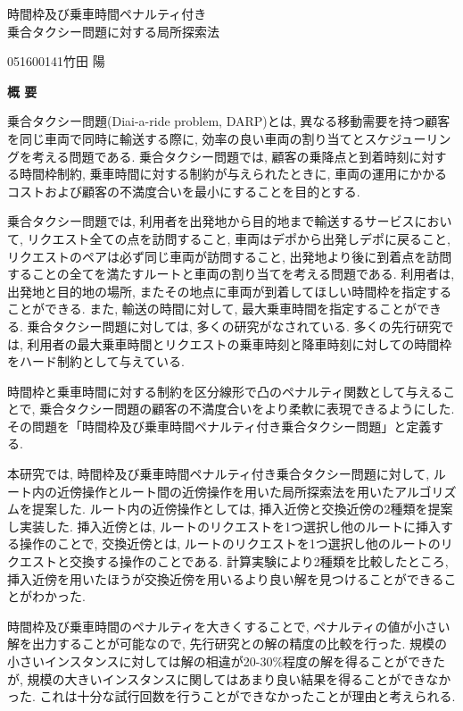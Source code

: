 \begin{center}
{\LARGE 時間枠及び乗車時間ペナルティ付き\\乗合タクシー問題に対する局所探索法}\\[0.5cm]
\end{center}
\hfill
{\large 051600141\qquad 竹田 陽}\\[0.5cm]
\begin{center}
{\Large \bf 概 要}\\
\end{center}


乗合タクシー問題(Diai-a-ride problem, DARP)とは, 異なる移動需要を持つ顧客を同じ車両で同時に輸送する際に, 効率の良い車両の割り当てとスケジューリングを考える問題である. 乗合タクシー問題では, 顧客の乗降点と到着時刻に対する時間枠制約, 乗車時間に対する制約が与えられたときに, 車両の運用にかかるコストおよび顧客の不満度合いを最小にすることを目的とする.

乗合タクシー問題では, 利用者を出発地から目的地まで輸送するサービスにおいて, リクエスト全ての点を訪問すること, 車両はデポから出発しデポに戻ること, リクエストのペアは必ず同じ車両が訪問すること, 出発地より後に到着点を訪問することの全てを満たすルートと車両の割り当てを考える問題である. 利用者は, 出発地と目的地の場所, またその地点に車両が到着してほしい時間枠を指定することができる.
また, 輸送の時間に対して, 最大乗車時間を指定することができる.
乗合タクシー問題に対しては, 多くの研究がなされている. 多くの先行研究では, 利用者の最大乗車時間とリクエストの乗車時刻と降車時刻に対しての時間枠をハード制約として与えている.

時間枠と乗車時間に対する制約を区分線形で凸のペナルティ関数として与えることで, 乗合タクシー問題の顧客の不満度合いをより柔軟に表現できるようにした. その問題を「時間枠及び乗車時間ペナルティ付き乗合タクシー問題」と定義する.

本研究では, 時間枠及び乗車時間ペナルティ付き乗合タクシー問題に対して, ルート内の近傍操作とルート間の近傍操作を用いた局所探索法を用いたアルゴリズムを提案した.
ルート内の近傍操作としては, 挿入近傍と交換近傍の2種類を提案し実装した.
挿入近傍とは, ルートのリクエストを1つ選択し他のルートに挿入する操作のことで, 交換近傍とは, ルートのリクエストを1つ選択し他のルートのリクエストと交換する操作のことである.
計算実験により2種類を比較したところ, 挿入近傍を用いたほうが交換近傍を用いるより良い解を見つけることができることがわかった.

時間枠及び乗車時間のペナルティを大きくすることで, ペナルティの値が小さい解を出力することが可能なので, 先行研究との解の精度の比較を行った. 規模の小さいインスタンスに対しては解の相違が20-30\%程度の解を得ることができたが, 規模の大きいインスタンスに関してはあまり良い結果を得ることができなかった. これは十分な試行回数を行うことができなかったことが理由と考えられる.

